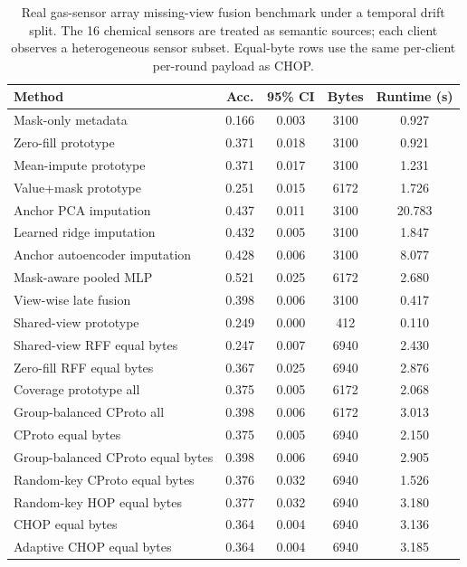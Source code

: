 \begin{table}[t]
\centering
\caption{Real gas-sensor array missing-view fusion benchmark under a temporal drift split. The 16 chemical sensors are treated as semantic sources; each client observes a heterogeneous sensor subset. Equal-byte rows use the same per-client per-round payload as CHOP.}
\label{tab:if-gas-drift-temporal-fusion}
\scriptsize
\setlength{\tabcolsep}{3pt}
\renewcommand{\arraystretch}{0.94}
\begin{tabular}{lcccc}
\toprule
Method & Acc. & 95\% CI & Bytes & Runtime (s) \\
\midrule
Mask-only metadata & 0.166 & 0.003 & 3100 & 0.927 \\
Zero-fill prototype & 0.371 & 0.018 & 3100 & 0.921 \\
Mean-impute prototype & 0.371 & 0.017 & 3100 & 1.231 \\
Value+mask prototype & 0.251 & 0.015 & 6172 & 1.726 \\
Anchor PCA imputation & 0.437 & 0.011 & 3100 & 20.783 \\
Learned ridge imputation & 0.432 & 0.005 & 3100 & 1.847 \\
Anchor autoencoder imputation & 0.428 & 0.006 & 3100 & 8.077 \\
Mask-aware pooled MLP & 0.521 & 0.025 & 6172 & 2.680 \\
View-wise late fusion & 0.398 & 0.006 & 3100 & 0.417 \\
Shared-view prototype & 0.249 & 0.000 & 412 & 0.110 \\
Shared-view RFF equal bytes & 0.247 & 0.007 & 6940 & 2.430 \\
Zero-fill RFF equal bytes & 0.367 & 0.025 & 6940 & 2.876 \\
Coverage prototype all & 0.375 & 0.005 & 6172 & 2.068 \\
Group-balanced CProto all & 0.398 & 0.006 & 6172 & 3.013 \\
CProto equal bytes & 0.375 & 0.005 & 6940 & 2.150 \\
Group-balanced CProto equal bytes & 0.398 & 0.006 & 6940 & 2.905 \\
Random-key CProto equal bytes & 0.376 & 0.032 & 6940 & 1.526 \\
Random-key HOP equal bytes & 0.377 & 0.032 & 6940 & 3.180 \\
CHOP equal bytes & 0.364 & 0.004 & 6940 & 3.136 \\
Adaptive CHOP equal bytes & 0.364 & 0.004 & 6940 & 3.185 \\
\bottomrule
\end{tabular}
\end{table}
